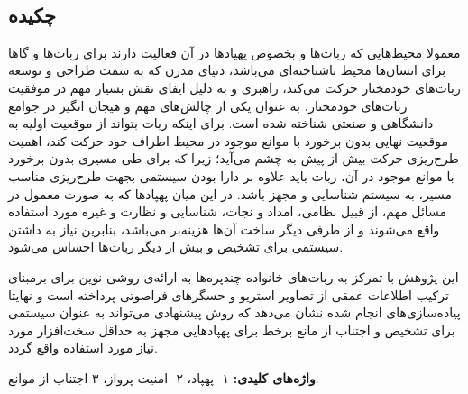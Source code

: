 
\setcounter{page}{1}
\thispagestyle{empty}

~\vfill

\subsection*{چکیده}
\begin{small}
\baselineskip=0.7cm
معمولا محیط‌هایی که ربات‌ها و بخصوص پهپادها در آن فعالیت دارند برای ربات‌ها و گاها برای انسان‌ها محیط‌ ناشناخته‌ای می‌باشد، دنیای مدرن که به سمت طراحی و توسعه ربات‌های خودمختار حرکت می‌کند، راهبری و  به دلیل ایفای نقش بسیار مهم در موفقیت ربات‌های خودمختار، به عنوان یکی از چالش‌های مهم و هیجان انگیز در جوامع دانشگاهی و صنعتی شناخته شده است. برای اینکه ربات بتواند از موقعیت اولیه به موقعیت نهایی بدون برخورد با موانع موجود در محیط اطراف خود حرکت کند، اهمیت طرح‌ریزی حرکت بیش از پیش به چشم می‌آید؛ زیرا که برای طی مسیری بدون برخورد با موانع موجود در آن، ربات باید علاوه بر دارا بودن سیستمی بجهت طرح‌ریزی مناسب مسیر، به سیستم شناسایی و  مجهز باشد. در این میان پهپادها که به صورت معمول در مسائل مهم، از قبیل نظامی، امداد و نجات، شناسایی و نظارت و غیره مورد استفاده واقع می‌شوند و از طرفی دیگر ساخت آن‌ها هزینه‌بر می‌باشد، بنابرین نیاز به داشتن سیستمی برای تشخیص و  بیش از دیگر ربات‌ها احساس می‌شود.

این پژوهش با تمرکز به ربات‌های خانواده چندپره‌ها به ارائه‌ی روشی نوین برای  برمبنای ترکیب اطلاعات عمقی از تصاویر استریو و حسگرهای فراصوتی پرداخته است و نهایتا پیاده‌سازی‌های انجام شده نشان می‌دهد که روش پیشنهادی می‌تواند به عنوان سیستمی برای تشخیص و اجتناب از مانع برخط برای پهپادهایی مجهز به حداقل سخت‌افزار مورد نیاز مورد استفاده واقع گردد.
\vspace*{0.5 cm}

\noindent\textbf{واژه‌های کلیدی:}
۱- پهپاد، ۲- امنیت پرواز، ۳-اجتناب از موانع.
\end{small}